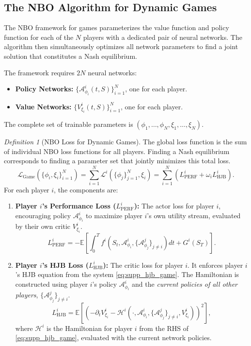 \documentclass[ecta,draft]{econsocart}
\theoremstyle{plain}
\theoremstyle{remark}
\newtheorem{definition}{Definition}
\newcommand{\E}{\mathbb{E}}
\newcommand{\hamiltonian}{\mathcal{H}}
\begin{document}
\subsection{The NBO Algorithm for Dynamic Games}

The NBO framework for games parameterizes the value function and policy function for each of the $N$ players with a dedicated pair of neural networks. The algorithm then simultaneously optimizes all network parameters to find a joint solution that constitutes a Nash equilibrium.

The framework requires $2N$ neural networks:
\begin{itemize}
    \item \textbf{Policy Networks:} $\{\mathcal{A}_{\phi_i}^i(t,S)\}_{i=1}^N$, one for each player.
    \item \textbf{Value Networks:} $\{V_{\xi_i}^i(t,S)\}_{i=1}^N$, one for each player.
\end{itemize}
The complete set of trainable parameters is $(\phi_1, \dots, \phi_N, \xi_1, \dots, \xi_N)$.

\begin{definition}[NBO Loss for Dynamic Games]
The global loss function is the sum of individual NBO loss functions for all players. Finding a Nash equilibrium corresponds to finding a parameter set that jointly minimizes this total loss.
\begin{equation}
\mathcal{L}_{\text{Game}}(\{\phi_i, \xi_i\}_{i=1}^N) = \sum_{i=1}^N \mathcal{L}^i(\{\phi_j\}_{j=1}^N, \xi_i) = \sum_{i=1}^N \left( L_{\text{PERF}}^i + \omega_i L_{\text{HJB}}^i \right).
\end{equation}
For each player $i$, the components are:
\begin{enumerate}
    \item \textbf{Player $i$'s Performance Loss ($L_{\text{PERF}}^i$):} The actor loss for player $i$, encouraging policy $\mathcal{A}_{\phi_i}^i$ to maximize player $i$'s own utility stream, evaluated by their own critic $V_{\xi_i}^i$.
    \begin{equation}
    L_{\text{PERF}}^i = - \E \left[ \int_0^T f^i(S_t, \mathcal{A}_{\phi_i}^i, \{\mathcal{A}_{\phi_j}^j\}_{j \neq i}) dt + G^i(S_T) \right].
    \end{equation}

    \item \textbf{Player $i$'s HJB Loss ($L_{\text{HJB}}^i$):} The critic loss for player $i$. It enforces player $i$'s HJB equation from the system \eqref{eq:supp_hjb_game}. The Hamiltonian is constructed using player $i$'s policy $\mathcal{A}_{\phi_i}^i$ and the \textit{current policies of all other players}, $\{\mathcal{A}_{\phi_j}^j\}_{j \neq i}$.
    \begin{equation}
    L_{\text{HJB}}^i = \E \left[ \left( -\partial_t V_{\xi_i}^i - \hamiltonian^i(\cdot, \mathcal{A}_{\phi_i}^i, \{\mathcal{A}_{\phi_j}^j\}_{j\neq i}, V_{\xi_i}^i) \right)^2 \right],
    \end{equation}
    where $\hamiltonian^i$ is the Hamiltonian for player $i$ from the RHS of \eqref{eq:supp_hjb_game}, evaluated with the current network policies.
\end{enumerate}
\end{definition}
\end{document}
